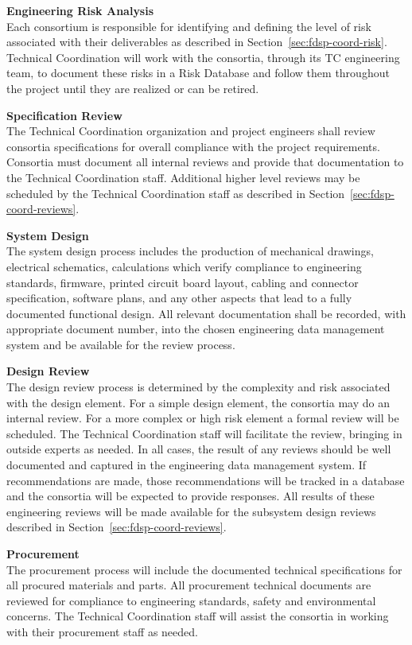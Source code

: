 {\bf Engineering Risk Analysis}\\ Each consortium is responsible for
identifying and defining the level of risk associated with their
deliverables as described in Section~\ref{sec:fdsp-coord-risk}.
 Technical Coordination will work with the consortia,
through its TC engineering team, to document these risks in a Risk
Database and follow them throughout the project until they are
realized or can be retired.

{\bf Specification Review}\\
The  Technical Coordination organization and project engineers
shall review consortia specifications for overall compliance with the
project requirements.  Consortia must document all internal reviews
and provide that documentation to the Technical Coordination staff.
Additional higher level reviews may be scheduled by the Technical
Coordination staff as described in Section~\ref{sec:fdsp-coord-reviews}.

{\bf System Design}\\
The system design process includes the production of mechanical
drawings, electrical schematics, calculations which verify compliance
to engineering standards, firmware, printed circuit board layout,
cabling and connector specification, software plans, and any other
aspects that lead to a fully documented functional design.  All
relevant documentation shall be recorded, with appropriate document
number, into the chosen engineering data management system and be
available for the review process.

{\bf Design Review}\\ The design review process is determined by the
complexity and risk associated with the design element.  For a simple
design element, the consortia may do an internal review.  For a more
complex or high risk element a formal review will be scheduled.  The
 Technical Coordination staff will facilitate the review,
bringing in outside experts as needed.  In all cases, the result of
any reviews should be well documented and captured in the engineering
data management system.  If recommendations are made, those
recommendations will be tracked in a database and the consortia will
be expected to provide responses. All results of these engineering
reviews will be made available for the subsystem design reviews
described in Section~\ref{sec:fdsp-coord-reviews}.

{\bf Procurement}\\ The procurement process will include the
documented technical specifications for all procured materials and
parts.  All procurement technical documents are reviewed for
compliance to engineering standards, safety and environmental
concerns.  The  Technical Coordination staff will assist the
consortia in working with their procurement staff as needed.

